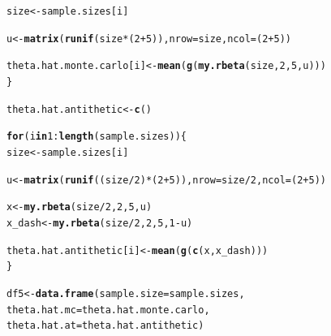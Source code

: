\documentclass[11pt, a4paper]{article}\usepackage[]{graphicx}\usepackage[]{xcolor}
\makeatletter
\newcommand{\hlnum}[1]{\textcolor[rgb]{0.686,0.059,0.569}{#1}}%
\newcommand{\hlopt}[1]{\textcolor[rgb]{0,0,0}{#1}}%
\newcommand{\hldef}[1]{\textcolor[rgb]{0.345,0.345,0.345}{#1}}%
\newcommand{\hlkwa}[1]{\textcolor[rgb]{0.161,0.373,0.58}{\textbf{#1}}}%
\newcommand{\hlkwb}[1]{\textcolor[rgb]{0.69,0.353,0.396}{#1}}%
\newcommand{\hlkwc}[1]{\textcolor[rgb]{0.333,0.667,0.333}{#1}}%
\newcommand{\hlkwd}[1]{\textcolor[rgb]{0.737,0.353,0.396}{\textbf{#1}}}%
\newenvironment{kframe}{%
 \def\at@end@of@kframe{}%
 \ifinner\ifhmode%
  \def\at@end@of@kframe{\end{minipage}}%
  \begin{minipage}{\columnwidth}%
 \fi\fi%
 \def\FrameCommand##1{\hskip\@totalleftmargin \hskip-\fboxsep
 \colorbox{shadecolor}{##1}\hskip-\fboxsep
     \hskip-\linewidth \hskip-\@totalleftmargin \hskip\columnwidth}%
 \MakeFramed {\advance\hsize-\width
   \@totalleftmargin\z@ \linewidth\hsize
   \@setminipage}}%
 {\par\unskip\endMakeFramed%
 \at@end@of@kframe}
\newenvironment{knitrout}{}{} %
\makeatother
\begin{document}
\begin{enumerate}
\begin{knitrout}
\begin{kframe}
\begin{alltt}
  \hldef{size} \hlkwb{<-} \hldef{sample.sizes[i]}

  \hldef{u} \hlkwb{<-} \hlkwd{matrix}\hldef{(}\hlkwd{runif}\hldef{(size} \hlopt{*} \hldef{(}\hlnum{2} \hlopt{+} \hlnum{5}\hldef{)),} \hlkwc{nrow} \hldef{= size,} \hlkwc{ncol} \hldef{= (}\hlnum{2} \hlopt{+} \hlnum{5}\hldef{))}

  \hldef{theta.hat.monte.carlo[i]} \hlkwb{<-} \hlkwd{mean}\hldef{(}\hlkwd{g}\hldef{(}\hlkwd{my.rbeta}\hldef{(size,} \hlnum{2}\hldef{,} \hlnum{5}\hldef{, u)))}
\hldef{\}}
\end{alltt}
\end{kframe}
\end{knitrout}

\begin{knitrout}
\color{fgcolor}\begin{kframe}
\begin{alltt}
\hldef{theta.hat.antithetic} \hlkwb{<-} \hlkwd{c}\hldef{()}

\hlkwa{for} \hldef{(i} \hlkwa{in} \hlnum{1}\hlopt{:}\hlkwd{length}\hldef{(sample.sizes)) \{}
  \hldef{size} \hlkwb{<-} \hldef{sample.sizes[i]}

  \hldef{u} \hlkwb{<-} \hlkwd{matrix}\hldef{(}\hlkwd{runif}\hldef{((size} \hlopt{/} \hlnum{2}\hldef{)} \hlopt{*} \hldef{(}\hlnum{2} \hlopt{+} \hlnum{5}\hldef{)),} \hlkwc{nrow} \hldef{= size} \hlopt{/} \hlnum{2}\hldef{,} \hlkwc{ncol} \hldef{= (}\hlnum{2} \hlopt{+} \hlnum{5}\hldef{))}

  \hldef{x} \hlkwb{<-} \hlkwd{my.rbeta}\hldef{(size} \hlopt{/} \hlnum{2}\hldef{,} \hlnum{2}\hldef{,} \hlnum{5}\hldef{, u)}
  \hldef{x_dash} \hlkwb{<-} \hlkwd{my.rbeta}\hldef{(size} \hlopt{/} \hlnum{2}\hldef{,} \hlnum{2}\hldef{,} \hlnum{5}\hldef{,} \hlnum{1}\hlopt{-}\hldef{u)}

  \hldef{theta.hat.antithetic[i]} \hlkwb{<-} \hlkwd{mean}\hldef{(}\hlkwd{g}\hldef{(}\hlkwd{c}\hldef{(x, x_dash)))}
\hldef{\}}
\end{alltt}
\end{kframe}
\end{knitrout}

\begin{knitrout}
\color{fgcolor}\begin{kframe}
\begin{alltt}
\hldef{df5} \hlkwb{<-} \hlkwd{data.frame}\hldef{(}\hlkwc{sample.size} \hldef{= sample.sizes,}
                  \hlkwc{theta.hat.mc} \hldef{= theta.hat.monte.carlo,}
                  \hlkwc{theta.hat.at} \hldef{= theta.hat.antithetic)}
\end{alltt}
\end{kframe}
\end{knitrout}



\end{enumerate}
\end{document}
